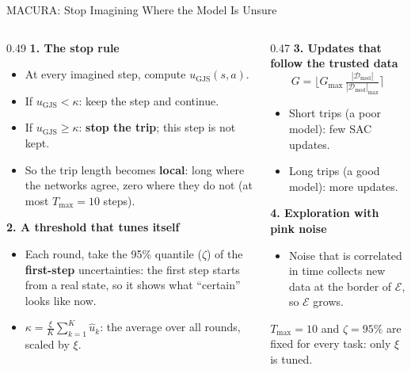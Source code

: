 \documentclass[aspectratio=169,10pt]{beamer}
\newcommand{\Dmod}{\mathcal{D}_{\mathrm{mod}}}
\newcommand{\E}{\mathcal{E}}
\newcommand{\ugjs}{u_{\mathrm{GJS}}}
\begin{document}
\begin{frame}{MACURA: Stop Imagining Where the Model Is Unsure}
  \begin{columns}[T]
    \begin{column}{0.49\textwidth}
      \textbf{1. The stop rule}
      \begin{itemize}\small
        \item At every imagined step, compute $\ugjs(s,a)$.
        \item If $\ugjs<\kappa$: keep the step and continue.
        \item If $\ugjs\ge\kappa$: \textbf{stop the trip}; this step is not kept.
        \item So the trip length becomes \textbf{local}: long where the networks agree, zero where they do not
              (at most $T_{\max}=10$ steps).
      \end{itemize}
      \textbf{2. A threshold that tunes itself}
      \begin{itemize}\small
        \item Each round, take the 95\% quantile ($\zeta$) of the \textbf{first-step} uncertainties: the first step
              starts from a real state, so it shows what ``certain'' looks like now.
        \item $\kappa=\frac{\xi}{K}\sum_{k=1}^{K}\hat u_k$: the average over all rounds, scaled by $\xi$.
      \end{itemize}
    \end{column}
    \begin{column}{0.47\textwidth}
      \textbf{3. Updates that follow the trusted data}
      \[ G=\Big\lfloor G_{\max}\,\tfrac{|\Dmod|}{|\Dmod|_{\max}}\Big\rceil \]
      \begin{itemize}\small
        \item Short trips (a poor model): few SAC updates.
        \item Long trips (a good model): more updates.
      \end{itemize}
      \textbf{4. Exploration with pink noise}
      \begin{itemize}\small
        \item Noise that is correlated in time collects new data at the border of $\E$, so $\E$ grows.
      \end{itemize}
      \vspace{0.3em}
      \colorbox{myblue!10}{\parbox{0.95\linewidth}{\small $T_{\max}=10$ and $\zeta=95\%$ are fixed for every task:
      only $\xi$ is tuned.}}
    \end{column}
  \end{columns}
\end{frame}
\end{document}
